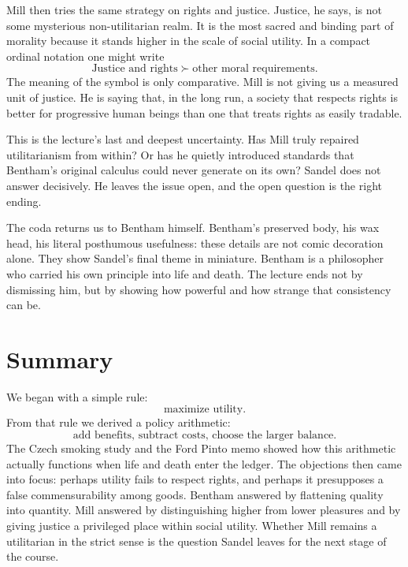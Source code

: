 Mill then tries the same strategy on rights and justice. Justice, he says, is not some mysterious non-utilitarian realm. It is the most sacred and binding part of morality because it stands higher in the scale of social utility. In a compact ordinal notation one might write
\begin{equation}
\text{Justice and rights} \succ \text{other moral requirements}.
\end{equation}
The meaning of the symbol is only comparative. Mill is not giving us a measured unit of justice. He is saying that, in the long run, a society that respects rights is better for progressive human beings than one that treats rights as easily tradable.

This is the lecture's last and deepest uncertainty. Has Mill truly repaired utilitarianism from within? Or has he quietly introduced standards that Bentham's original calculus could never generate on its own? Sandel does not answer decisively. He leaves the issue open, and the open question is the right ending.

The coda returns us to Bentham himself. Bentham's preserved body, his wax head, his literal posthumous usefulness: these details are not comic decoration alone. They show Sandel's final theme in miniature. Bentham is a philosopher who carried his own principle into life and death. The lecture ends not by dismissing him, but by showing how powerful and how strange that consistency can be.

\section{Summary}

We began with a simple rule:
\[
\text{maximize utility}.
\]
From that rule we derived a policy arithmetic:
\[
\text{add benefits, subtract costs, choose the larger balance}.
\]
The Czech smoking study and the Ford Pinto memo showed how this arithmetic actually functions when life and death enter the ledger. The objections then came into focus: perhaps utility fails to respect rights, and perhaps it presupposes a false commensurability among goods. Bentham answered by flattening quality into quantity. Mill answered by distinguishing higher from lower pleasures and by giving justice a privileged place within social utility. Whether Mill remains a utilitarian in the strict sense is the question Sandel leaves for the next stage of the course.